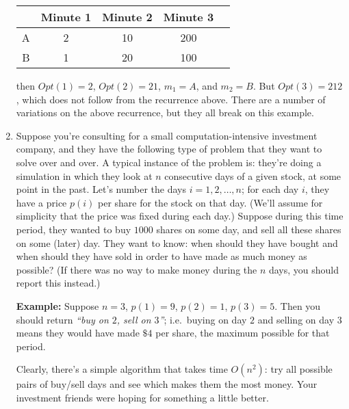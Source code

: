 \documentclass[12pt]{article}
\begin{document}
\begin{enumerate}
{\begin{table}[h]
\begin{center}
\begin{tabular}{|c||c|c|c|c|}
\hline & Minute 1 & Minute 2 & Minute 3 \\ \hline
A & 2 & 10 & 200   \\ \hline
B & 1 & 20 & 100   \\ \hline
\end{tabular}
\end{center}
\end{table}

\noindent then $Opt(1) = 2$, $Opt(2) = 21$,
$m_1 = A$, and $m_2 = B$.
But $Opt(3) = 212$, which does not follow
from the recurrence above.
There are a number of variations on the above recurrence,
but they all break on this example.

}



\item

Suppose you're consulting for a small computation-intensive
investment company, and they have the following type
of problem that they want to solve over and over.
A typical instance of the problem is: they're doing a
simulation in which they look at $n$ consecutive days of a given stock,
at some point in the past.
Let's number the days $i = 1, 2, \ldots, n$;
for each day $i$, they have a price $p(i)$ per share for the stock on that day.
(We'll assume for simplicity that the price was fixed during each day.)
Suppose during this time period, they wanted to buy $1000$ shares
on some day, and sell all these shares on some (later) day.
They want to know:
when should they have bought and when should they have sold
in order to have made as much money as possible?
(If there was no way to make money during the
$n$ days, you should report this instead.)

{\bf Example:} Suppose $n = 3$, $p(1) = 9$, $p(2) = 1$, $p(3) = 5$.
Then you should return {\em ``buy on $2$, sell on $3$''};
i.e.~buying on day $2$
and selling on day $3$ means they would have made
$\$4$ per share, the maximum possible for that period.

Clearly, there's a simple algorithm that takes time $O(n^2)$:
try all possible pairs of buy/sell days and see which
makes them the most money.
Your investment friends were hoping for something a little better.


\end{enumerate}
\end{document}
